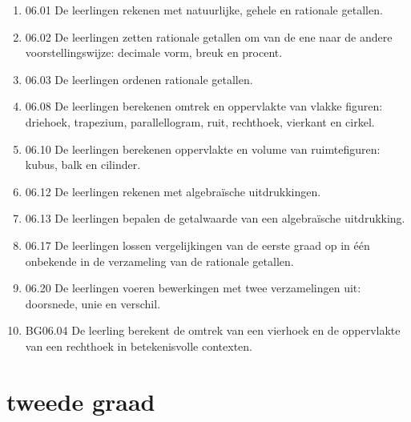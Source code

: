 \documentclass{article}
\begin{document}
    \begin{enumerate}
        
        
        \item 06.01 De leerlingen rekenen met natuurlijke, gehele en rationale getallen.
        
        \item 06.02 De leerlingen zetten rationale getallen om van de ene naar de andere voorstellingswijze: decimale vorm, breuk en procent.
        
        \item 06.03 De leerlingen ordenen rationale getallen.
        
        \item 06.08 De leerlingen berekenen omtrek en oppervlakte van vlakke figuren: driehoek, trapezium, parallellogram, ruit, rechthoek, vierkant en cirkel.
        
        \item 06.10 De leerlingen berekenen oppervlakte en volume van ruimtefiguren: kubus, balk en cilinder.
        
        \item 06.12 De leerlingen rekenen met algebraïsche uitdrukkingen.
        
        \item 06.13 De leerlingen bepalen de getalwaarde van een algebraïsche uitdrukking.
        
        \item 06.17 De leerlingen lossen vergelijkingen van de eerste graad op in één onbekende in de verzameling van de rationale getallen.
        
        \item 06.20 De leerlingen voeren bewerkingen met twee verzamelingen uit: doorsnede, unie en verschil.
        
        \item BG06.04 De leerling berekent de omtrek van een vierhoek en de oppervlakte van een rechthoek in betekenisvolle contexten.
        
    \end{enumerate}
    
    
\section{tweede graad}
\end{document}
